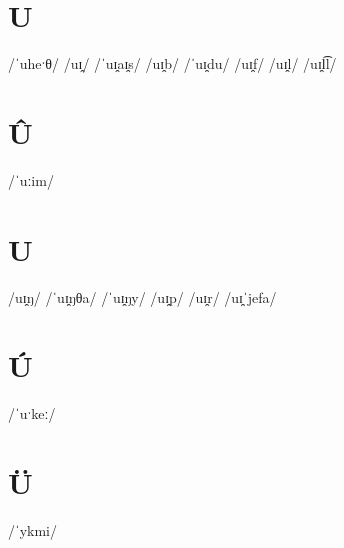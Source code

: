 \documentclass[10pt,a4paper,twoside]{book}
\begin{document}
\section*{U}

\begin{multicols}{3}
 {/ˈuheˑθ/} {}
 {/uɪ̯/} {}
 {/ˈuɪ̯aɪ̯s/} {}
 {/uɪ̯b/} {}
 {/ˈuɪ̯du/} {}
 {/uɪ̯f/} {}
 {/uɪ̯l/} {}
 {/uɪ̯l͡l/} {}
\end{multicols}

\section*{Û}

\begin{multicols}{3}
 {/ˈuːim/} {}
\end{multicols}

\section*{U}

\begin{multicols}{3}
 {/uɪ̯ŋ/} {}
 {/ˈuɪ̯ŋθa/} {}
 {/ˈuɪ̯ŋy/} {}
 {/uɪ̯p/} {}
 {/uɪ̯r/} {}
 {/uɪ̯ˈjefa/} {}
\end{multicols}

\section*{Ú}

\begin{multicols}{3}
 {/ˈuˑkeː/} {}
\end{multicols}

\section*{Ü}

\begin{multicols}{3}
 {/ˈykmi/} {}
\end{multicols}
\end{document}
